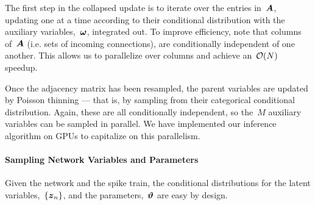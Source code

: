 The first step in the collapsed update is to iterate over the
entries in~$\boldsymbol{A}$, updating one at a time according to their
conditional distribution with the auxiliary variables,~$\boldsymbol{\omega}$,
integrated out. To improve efficiency, note that columns of~$\boldsymbol{A}$
(i.e. sets of incoming connections), are conditionally
independent of one another. This allows us to parallelize over
columns and achieve an~$\mathcal{O}(N)$ speedup.

Once the adjacency matrix has been resampled, the parent variables
are updated by Poisson thinning --- that is, by sampling from their
categorical conditional distribution. Again, these are all conditionally
independent, so the~$M$ auxiliary variables can be sampled in parallel.
We have implemented our inference algorithm on GPUs to capitalize
on this parallelism.

\paragraph{Sampling Network Variables and Parameters}
Given the network and the spike train, the conditional distributions 
for the latent variables,~$\{\boldsymbol{z}_n\}$, and the parameters,~$\boldsymbol{\vartheta}$ 
are easy by design.

